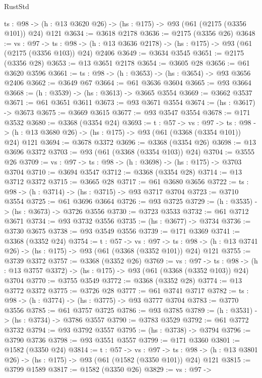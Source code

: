 \begin{lexlean}{RustStd}
\begin{coremodule}
  {ts : @98} -> (h : @13 @3620 @26) -> (hs : @175) -> @93 (@61 (@2175 (@3356 @101)) @24) @121
@3634 := @3618 @2178
@3636 := @2175 (@3356 @26)
@3648 := {vs : @97} ->
  {ts : @98} -> (h : @13 @3636 @2178) -> (hs : @175) -> @93 (@61 (@2175 (@3356 @103)) @24) @2406
@3649 := @3634 @3545
@3651 := @2175 (@3356 @28)
@3653 := @13 @3651 @2178
@3654 := @3605 @28
@3656 := @61 @3620 @3596
@3661 := {ts : @98} -> (h : @3653) -> (hs : @3654) -> @93 @3656 @2406
@3662 := @3649 @67
@3664 := @61 @3636 @3604
@3665 := @93 @3664
@3668 := (h : @3539) -> (hs : @3613) -> @3665 @3554
@3669 := @3662 @3537
@3671 := @61 @3651 @3611
@3673 := @93 @3671 @3554
@3674 := (hs : @3617) -> @3673
@3675 := @3669 @3615
@3677 := @93 @3547 @3554
@3678 := @171 @3532
@3680 := @3368 (@3354 @24)
@3693 := {t : @57} ->
  {vs : @97} ->
  {ts : @98} -> (h : @13 @3680 @26) -> (hs : @175) -> @93 (@61 (@3368 (@3354 @101)) @24) @121
@3694 := @3678 @3372
@3696 := @3368 (@3354 @26)
@3698 := @13 @3696 @3372
@3703 := @93 (@61 (@3368 (@3354 @103)) @24)
@3704 := @3555 @26
@3709 := {vs : @97} -> {ts : @98} -> (h : @3698) -> (hs : @175) -> @3703 @3704
@3710 := @3694 @3547
@3712 := @3368 (@3354 @28)
@3714 := @13 @3712 @3372
@3715 := @3665 @28
@3717 := @61 @3680 @3656
@3722 := {ts : @98} -> (h : @3714) -> (hs : @3715) -> @93 @3717 @3704
@3723 := @3710 @3554
@3725 := @61 @3696 @3664
@3726 := @93 @3725
@3729 := (h : @3535) -> (hs : @3673) -> @3726 @3556
@3730 := @3723 @3533
@3732 := @61 @3712 @3671
@3734 := @93 @3732 @3556
@3735 := (hs : @3677) -> @3734
@3736 := @3730 @3675
@3738 := @93 @3549 @3556
@3739 := @171 @3369
@3741 := @3368 (@3352 @24)
@3754 := {t : @57} ->
  {vs : @97} ->
  {ts : @98} -> (h : @13 @3741 @26) -> (hs : @175) -> @93 (@61 (@3368 (@3352 @101)) @24) @121
@3755 := @3739 @3372
@3757 := @3368 (@3352 @26)
@3769 := {vs : @97} ->
  {ts : @98} -> (h : @13 @3757 @3372) -> (hs : @175) -> @93 (@61 (@3368 (@3352 @103)) @24) @3704
@3770 := @3755 @3549
@3772 := @3368 (@3352 @28)
@3774 := @13 @3772 @3372
@3775 := @3726 @28
@3777 := @61 @3741 @3717
@3782 := {ts : @98} -> (h : @3774) -> (hs : @3775) -> @93 @3777 @3704
@3783 := @3770 @3556
@3785 := @61 @3757 @3725
@3786 := @93 @3785
@3789 := (h : @3531) -> (hs : @3734) -> @3786 @3557
@3790 := @3783 @3529
@3792 := @61 @3772 @3732
@3794 := @93 @3792 @3557
@3795 := (hs : @3738) -> @3794
@3796 := @3790 @3736
@3798 := @93 @3551 @3557
@3799 := @171 @3360
@3801 := @1582 (@3350 @24)
@3814 := {t : @57} ->
  {vs : @97} ->
  {ts : @98} -> (h : @13 @3801 @26) -> (hs : @175) -> @93 (@61 (@1582 (@3350 @101)) @24) @121
@3815 := @3799 @1589
@3817 := @1582 (@3350 @26)
@3829 := {vs : @97} ->

\end{coremodule}
\end{lexlean}
